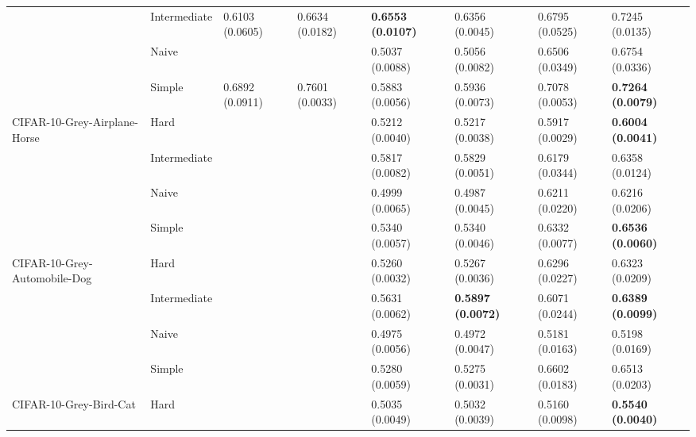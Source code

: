 \begin{tabular}{llllllll}
                 & Intermediate &  0.6103 (0.0605) &           0.6634 (0.0182) &  \textbf{0.6553 (0.0107)} &           0.6356 (0.0045) &           0.6795 (0.0525) &           0.7245 (0.0135) \\
                 & Naive &                  &                           &           0.5037 (0.0088) &           0.5056 (0.0082) &           0.6506 (0.0349) &           0.6754 (0.0336) \\
                 & Simple &  0.6892 (0.0911) &           0.7601 (0.0033) &           0.5883 (0.0056) &           0.5936 (0.0073) &           0.7078 (0.0053) &  \textbf{0.7264 (0.0079)} \\
CIFAR-10-Grey-Airplane-Horse & Hard &                  &                           &           0.5212 (0.0040) &           0.5217 (0.0038) &           0.5917 (0.0029) &  \textbf{0.6004 (0.0041)} \\
                 & Intermediate &                  &                           &           0.5817 (0.0082) &           0.5829 (0.0051) &           0.6179 (0.0344) &           0.6358 (0.0124) \\
                 & Naive &                  &                           &           0.4999 (0.0065) &           0.4987 (0.0045) &           0.6211 (0.0220) &           0.6216 (0.0206) \\
                 & Simple &                  &                           &           0.5340 (0.0057) &           0.5340 (0.0046) &           0.6332 (0.0077) &  \textbf{0.6536 (0.0060)} \\
CIFAR-10-Grey-Automobile-Dog & Hard &                  &                           &           0.5260 (0.0032) &           0.5267 (0.0036) &           0.6296 (0.0227) &           0.6323 (0.0209) \\
                 & Intermediate &                  &                           &           0.5631 (0.0062) &  \textbf{0.5897 (0.0072)} &           0.6071 (0.0244) &  \textbf{0.6389 (0.0099)} \\
                 & Naive &                  &                           &           0.4975 (0.0056) &           0.4972 (0.0047) &           0.5181 (0.0163) &           0.5198 (0.0169) \\
                 & Simple &                  &                           &           0.5280 (0.0059) &           0.5275 (0.0031) &           0.6602 (0.0183) &           0.6513 (0.0203) \\
CIFAR-10-Grey-Bird-Cat & Hard &                  &                           &           0.5035 (0.0049) &           0.5032 (0.0039) &           0.5160 (0.0098) &  \textbf{0.5540 (0.0040)} \\

\end{tabular}

